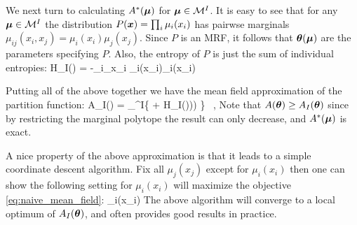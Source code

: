 We next turn to calculating $A^*(\boldsymbol{\mu})$ for $\boldsymbol{\mu}\in{\cal{M}}^{I}$. It is easy to see that for any $\boldsymbol{\mu} \in  {\cal{M}}^{I}$  the distribution $P(\boldsymbol{x}) = \prod_{i} \mu_i(x_i)$ has pairwse marginals $\mu_{ij}(x_i,x_j) =  \mu_i(x_i)\mu_j(x_j)$. Since $P$ is an MRF, it follows that
$\boldsymbol{\theta}(\boldsymbol{\mu})$ are the parameters specifying $P$. Also, the entropy of $P$ is just the sum of individual entropies:
\be
H_{I}(\muv) = -\sum_{i}\sum_{x_i} \mu_i(x_i)\log\mu_i(x_i)
\ee 

Putting all of the above together we have the mean field approximation of the partition function:  
\be
A_{I}(\thetav) = \sup_{\muv \in \margpoly^{I}}\left \{ \muv \cdot \thetav + H_{I}(\muv))) \right\} \label{eq:naive_mean_field}~,
\ee
Note that $A(\boldsymbol{\theta}) \geq A_{I}(\boldsymbol{\theta})$ since by restricting the marginal polytope the result can only decrease, and $A^*(\boldsymbol{\mu})$ is exact.

A nice property of the above approximation is that it leads to a simple coordinate descent algorithm. Fix all $\mu_j(x_j)$ except for $\mu_i(x_i)$ then one can show the following setting for $\mu_i(x_i)$ will maximize the objective \eqref{eq:naive_mean_field}:
\be
\mu_i(x_i) \propto {} \label{eq:naive_iter}
\ee
The above algorithm will converge to a local optimum of $A_{I}(\boldsymbol{\theta})$, and often provides good results in practice.




